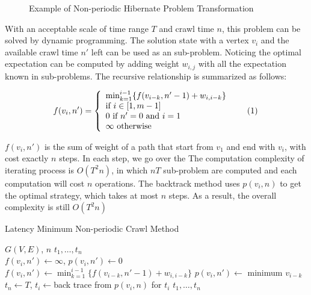 \documentclass[conference]{IEEEtran}
\newcommand\numberthis{\addtocounter{equation}{1}\tag{\theequation}}
\begin{document}
\begin{figure}
\centering

\captionsetup{justification=centering}
\caption{Example of Non-periodic Hibernate Problem Transformation}
\label{fig:problemtrans}
\end{figure}


With an acceptable scale of time range $T$ and crawl time $n$, this problem can be solved by dynamic programming. The solution state with a vertex $v_i$ and the available crawl time $n'$ left can be used as an sub-problem. Noticing the optimal expectation can be computed by adding weight $w_{i,j}$ with all the expectation known in sub-problems. The recursive relationship is summarized as follows:

\[f(v_i, n')=\left\{
    \begin{array}{lr}
	\min_{k=1}^{i-1}\{f(v_{i-k}, n'-1)+w_{i,i-k}\}\\
    \text{if }i\in[1, m-1]\\
    0\text{ if }n'=0\text{ and }i=1\\
    \infty\text{ otherwise}
    \end{array}\numberthis \label{dp}
    \right.
\]


$f(v_i,n')$ is the sum of weight of a path that start from $v_1$ and end with $v_i$, with cost exactly $n$ steps. In each step, we go over the  The computation complexity of iterating process is $O(T^2n)$, in which $nT$ sub-problem are computed and each computation will cost $n$ operations. The backtrack method uses $p(v_i, n)$ to get the optimal strategy, which takes at most $n$ steps. As a result, the overall complexity is still $O(T^2n)$ 

\begin{algorithm}
\caption{Latency Minimum Non-periodic Crawl Method}
  \label{alg:dp_min}
  \begin{algorithmic}[1]
  \renewcommand{\algorithmicrequire}{\textbf{Input:}}
  \renewcommand{\algorithmicensure}{\textbf{Output:}}
  \REQUIRE $G(V,E)$, $n$
  \ENSURE  $t_1,\ldots,t_n$
  \\
  \STATE $f(v_i,n') \gets \infty$, $p(v_i,n')\gets 0$
      \STATE $f(v_i,n')\gets\min_{k=1}^{i-1}\{f(v_{i-k}, n'-1)+w_{i,i-k}\}$
      \STATE $p(v_i,n')\gets$ minimum $v_{i-k}$
    \ENDFOR
  \ENDFOR
  \STATE $t_n\gets T$, $t_i\gets$back trace from $p(v_i, n)$ for $t_i$
  \RETURN $t_1,\ldots,t_n$
  \end{algorithmic}
\end{algorithm}
\end{document}
